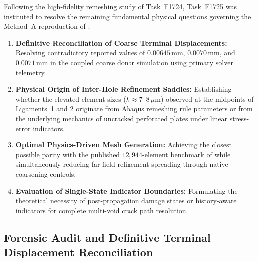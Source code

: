 Following the high-fidelity remeshing study of Task~F1724, Task~F1725 was instituted to resolve the remaining fundamental physical questions governing the Method~A reproduction of \citet{pandey2025}:
\begin{enumerate}
  \item \textbf{Definitive Reconciliation of Coarse Terminal Displacements:} Resolving contradictory reported values of $0.00645\,\mathrm{mm}$, $0.0070\,\mathrm{mm}$, and $0.0071\,\mathrm{mm}$ in the coupled coarse donor simulation using primary \Abaqus solver telemetry.
  \item \textbf{Physical Origin of Inter-Hole Refinement Saddles:} Establishing whether the elevated element sizes ($h \approx 7$--$8\,\mu\mathrm{m}$) observed at the midpoints of Ligaments~1 and 2 originate from Abaqus remeshing rule parameters or from the underlying mechanics of uncracked perforated plates under linear stress-error indicators.
  \item \textbf{Optimal Physics-Driven Mesh Generation:} Achieving the closest possible parity with the published $12{,}944$-element benchmark of \citet[Fig.~23b]{pandey2025} while simultaneously reducing far-field refinement spreading through native coarsening controls.
  \item \textbf{Evaluation of Single-State Indicator Boundaries:} Formulating the theoretical necessity of post-propagation damage states or history-aware indicators for complete multi-void crack path resolution.
\end{enumerate}

\subsection{Forensic Audit and Definitive Terminal Displacement Reconciliation}
\label{subsec:f1725_terminal_reconciliation}

